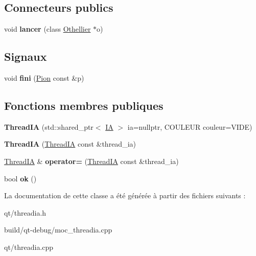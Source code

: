 \subsection*{Connecteurs publics}
\begin{DoxyCompactItemize}
\item 
void {\bfseries lancer} (class \hyperlink{classOthellier}{Othellier} $\ast$o)\hypertarget{classThreadIA_afadde3dc0d9f706ec124df98fbad142f}{}\label{classThreadIA_afadde3dc0d9f706ec124df98fbad142f}

\end{DoxyCompactItemize}
\subsection*{Signaux}
\begin{DoxyCompactItemize}
\item 
void {\bfseries fini} (\hyperlink{structPion}{Pion} const \&p)\hypertarget{classThreadIA_a4f71143a27d00d26d0b64aa651032c4f}{}\label{classThreadIA_a4f71143a27d00d26d0b64aa651032c4f}

\end{DoxyCompactItemize}
\subsection*{Fonctions membres publiques}
\begin{DoxyCompactItemize}
\item 
{\bfseries Thread\+IA} (std\+::shared\+\_\+ptr$<$ \hyperlink{classIA}{IA} $>$ ia=nullptr, C\+O\+U\+L\+E\+UR couleur=V\+I\+DE)\hypertarget{classThreadIA_a764755aa4409ec776732dc309afb92ab}{}\label{classThreadIA_a764755aa4409ec776732dc309afb92ab}

\item 
{\bfseries Thread\+IA} (\hyperlink{classThreadIA}{Thread\+IA} const \&thread\+\_\+ia)\hypertarget{classThreadIA_af39b22fe6161970620fabc931d4514ea}{}\label{classThreadIA_af39b22fe6161970620fabc931d4514ea}

\item 
\hyperlink{classThreadIA}{Thread\+IA} \& {\bfseries operator=} (\hyperlink{classThreadIA}{Thread\+IA} const \&thread\+\_\+ia)\hypertarget{classThreadIA_aab3359144355bca4fcb17a5af8addaab}{}\label{classThreadIA_aab3359144355bca4fcb17a5af8addaab}

\item 
bool {\bfseries ok} ()\hypertarget{classThreadIA_a82af5b2ce526995a4b73568ab470a5dd}{}\label{classThreadIA_a82af5b2ce526995a4b73568ab470a5dd}

\end{DoxyCompactItemize}


La documentation de cette classe a été générée à partir des fichiers suivants \+:\begin{DoxyCompactItemize}
\item 
qt/threadia.\+h\item 
build/qt-\/debug/moc\+\_\+threadia.\+cpp\item 
qt/threadia.\+cpp\end{DoxyCompactItemize}
